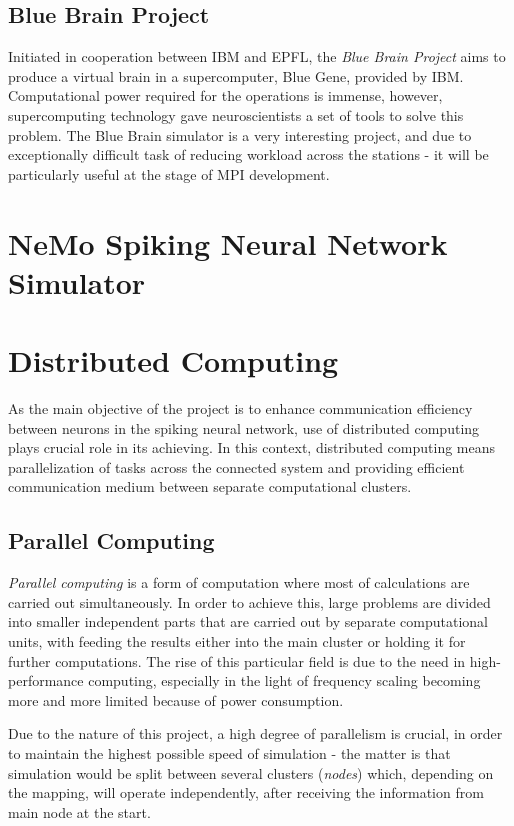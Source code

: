 \subsection{Blue Brain Project}

Initiated in cooperation between IBM and EPFL, the \emph{Blue Brain Project} aims to produce a virtual brain in a supercomputer, Blue Gene, provided by IBM.\cite{BlueBrain} Computational power
required for the operations is immense, however, supercomputing technology gave neuroscientists a set of tools to solve this problem. The Blue Brain simulator is
a very interesting project, and due to exceptionally difficult task of reducing workload across the stations - it will be particularly useful at the stage of MPI development.

\section{NeMo Spiking Neural Network Simulator}


\section{Distributed Computing}

As the main objective of the project is to enhance communication efficiency between neurons in the spiking neural network, use of distributed computing plays crucial
role in its achieving. In this context, distributed computing means parallelization of tasks across the connected system and providing efficient communication medium
between separate computational clusters.

\subsection{Parallel Computing}

\emph{Parallel computing} is a form of computation where most of calculations are carried out simultaneously.\cite{G.S.Almasi1989} In order to achieve this, large problems
are divided into smaller independent parts that are carried out by separate computational units, with feeding the results either into the main cluster or holding it for further
computations. The rise of this particular field is due to the need in high-performance computing, especially in the light of frequency scaling becoming more and more
limited because of power consumption.\cite{Kumar2002}

Due to the nature of this project, a high degree of parallelism is crucial, in order to maintain the highest possible speed of simulation - the matter is that simulation would
be split between several clusters (\emph{nodes}) which, depending on the mapping, will operate independently, after receiving the information from main node at the start.

